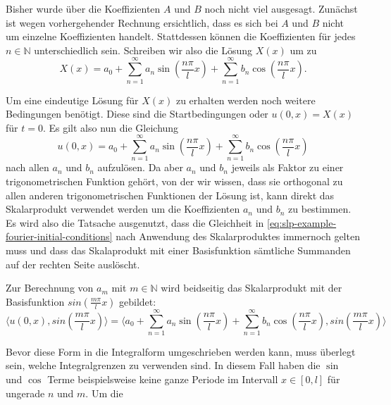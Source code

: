 
Bisher wurde über die Koeffizienten $A$ und $B$ noch nicht viel ausgesagt.
Zunächst ist wegen vorhergehender Rechnung ersichtlich, dass es sich bei
$A$ und $B$ nicht um einzelne Koeffizienten handelt.
Stattdessen können die Koeffizienten für jedes $n \in \mathbb{N}$
unterschiedlich sein.
Schreiben wir also die Lösung $X(x)$ um zu
\[
    X(x)
    =
    a_0
    +
    \sum_{n = 1}^{\infty} a_n\sin\left(\frac{n\pi}{l}x\right)
    +
    \sum_{n = 1}^{\infty} b_n\cos\left(\frac{n\pi}{l}x\right).
\]

Um eine eindeutige Lösung für $ X(x) $ zu erhalten werden noch weitere
Bedingungen benötigt.
Diese sind die Startbedingungen oder $u(0, x) = X(x)$ für $t = 0$.
Es gilt also nun die Gleichung
\begin{equation}
    \label{eq:slp-example-fourier-initial-conditions}
    u(0, x)
    =
    a_0
    +
    \sum_{n = 1}^{\infty} a_n\sin\left(\frac{n\pi}{l}x\right)
    +
    \sum_{n = 1}^{\infty} b_n\cos\left(\frac{n\pi}{l}x\right)
\end{equation}
nach allen $a_n$ und $b_n$ aufzulösen.
Da aber $a_n$ und $b_n$ jeweils als Faktor zu einer trigonometrischen Funktion
gehört, von der wir wissen, dass sie orthogonal zu allen anderen
trigonometrischen Funktionen der Lösung ist, kann direkt das Skalarprodukt
verwendet werden um die Koeffizienten $a_n$ und $b_n$ zu bestimmen.
Es wird also die Tatsache ausgenutzt, dass die Gleichheit in
\eqref{eq:slp-example-fourier-initial-conditions} nach Anwendung des
Skalarproduktes immernoch gelten muss und dass das Skalaprodukt mit einer
Basisfunktion sämtliche Summanden auf der rechten Seite auslöscht.

Zur Berechnung von $a_m$ mit $ m \in \mathbb{N} $ wird beidseitig das
Skalarprodukt mit der Basisfunktion $ sin\left(\frac{m \pi}{l}x\right)$
gebildet:
\[
    \langle u(0, x), sin\left(\frac{m \pi}{l}x\right) \rangle
    =
    \langle a_0
    +
    \sum_{n = 1}^{\infty} a_n\sin\left(\frac{n\pi}{l}x\right)
    +
    \sum_{n = 1}^{\infty} b_n\cos\left(\frac{n\pi}{l}x\right),
    sin\left(\frac{m \pi}{l}x\right)\rangle
\]

Bevor diese Form in die Integralform umgeschrieben werden kann, muss überlegt
sein, welche Integralgrenzen zu verwenden sind.
In diesem Fall haben die $ \sin $ und $ \cos $ Terme beispielsweise keine ganze
Periode im Intervall $ x \in [0, l] $ für ungerade $ n $ und $ m $.
Um die 

